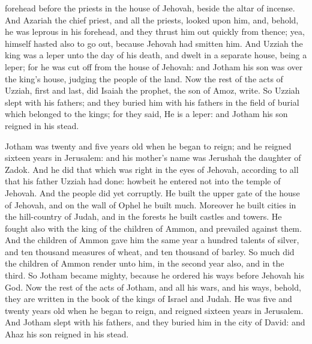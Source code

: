 forehead before the priests in the house of Jehovah, beside the altar of incense. And Azariah the chief priest, and all the priests, looked upon him, and, behold, he was leprous in his forehead, and they thrust him out quickly from thence; yea, himself hasted also to go out, because Jehovah had smitten him. And Uzziah the king was a leper unto the day of his death, and dwelt in a separate house, being a leper; for he was cut off from the house of Jehovah: and Jotham his son was over the king’s house, judging the people of the land. Now the rest of the acts of Uzziah, first and last, did Isaiah the prophet, the son of Amoz, write. So Uzziah slept with his fathers; and they buried him with his fathers in the field of burial which belonged to the kings; for they said, He is a leper: and Jotham his son reigned in his stead. 

Jotham was twenty and five years old when he began to reign; and he reigned sixteen years in Jerusalem: and his mother’s name was Jerushah the daughter of Zadok. And he did that which was right in the eyes of Jehovah, according to all that his father Uzziah had done: howbeit he entered not into the temple of Jehovah. And the people did yet corruptly. He built the upper gate of the house of Jehovah, and on the wall of Ophel he built much. Moreover he built cities in the hill-country of Judah, and in the forests he built castles and towers. He fought also with the king of the children of Ammon, and prevailed against them. And the children of Ammon gave him the same year a hundred talents of silver, and ten thousand measures of wheat, and ten thousand of barley. So much did the children of Ammon render unto him, in the second year also, and in the third. So Jotham became mighty, because he ordered his ways before Jehovah his God. Now the rest of the acts of Jotham, and all his wars, and his ways, behold, they are written in the book of the kings of Israel and Judah. He was five and twenty years old when he began to reign, and reigned sixteen years in Jerusalem. And Jotham slept with his fathers, and they buried him in the city of David: and Ahaz his son reigned in his stead. 

